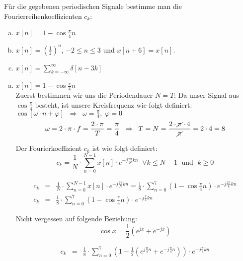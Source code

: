 \begin{uebsp}
\begin{Exercise}
Für die gegebenen periodischen Signale bestimme man die Fourierreihenkoeffizienten $c_k$:
\begin{enumerate}[a)]
    \item $x[n]=1-\cos\frac{\pi}{4}n$
    \item $x[n]=\left(\frac{1}{2}\right)^n$, $-2\leq n \leq 3$ und $x[n+6]=x[n]$.
    \item $x[n]=\sum_{k=-\infty}^\infty\delta[n-3k]$
\end{enumerate}
\end{Exercise}
\begin{Answer}
\begin{enumerate}[a)]
    \item $x[n]=1-\cos\frac{\pi}{4}n$\\
        Zuerst bestimmen wir uns die Periodendauer $N=T$:
        Da unser Signal aus $\cos\frac{\pi}{4}$ besteht, ist unsere Kreisfrequenz wie folgt definiert: \\
        $\cos[\omega\cdot n+\varphi]\;\;\Rightarrow\;\;\omega=\frac{\pi}{4},\;\varphi=0$
        \[\omega=2\cdot \pi\cdot f=\frac{2\cdot\pi}{T}=\frac{\pi}{4}\;\;\Rightarrow\;\;T=N=\frac{2\cdot\cancel\pi\cdot 4}{\cancel\pi}=2\cdot 4=8\]
        \begin{uebsp_theory}
            Der Fourierkoeffizient $c_k$ ist wie folgt definiert:
            \[c_k=\frac{1}{N}\cdot\sum_{n=0}^{N-1}x[n]\cdot e^{-j\frac{2\pi}{N}kn}\;\;\forall k\leq N-1\;\text{ und }\;k\geq 0\]
        \end{uebsp_theory}
        \begin{eqnarray*}
            c_k&=&\frac{1}{N}\cdot\sum_{n=0}^{N-1}x[n]\cdot e^{-j\frac{2\pi}{N}kn}=
            \frac{1}{8}\cdot\sum_{n=0}^{7}\left(1-\cos\frac{\pi}{4}n\right)\cdot e^{-j\frac{2\pi}{8}kn}\\
            c_k&=&\frac{1}{8}\cdot\sum_{n=0}^{7}\left(1-\cos\frac{\pi}{4}n\right)\cdot e^{-j\frac{\pi}{4}kn}
        \end{eqnarray*}
        \begin{uebsp_theory}
            Nicht vergessen auf folgende Beziehung: \[\cos x=\frac{1}{2}\left(e^{jx}+e^{-jx}\right)\]
        \end{uebsp_theory}
        \begin{eqnarray*}
            c_k&=&\frac{1}{8}\cdot\sum_{n=0}^{7}\left(1-\frac{1}{2}\left(e^{j\frac{\pi}{4}n}+e^{-j\frac{\pi}{4}n}\right)\right)\cdot e^{-j\frac{\pi}{4}kn}\\

\end{eqnarray*}
\end{enumerate}
\end{Answer}
\end{uebsp}
